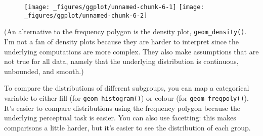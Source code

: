 \begin{Shaded}
\begin{Highlighting}[]
\StringTok{ }
\StringTok{  }\NormalTok{(} \NormalTok{)}
\StringTok{ }
\StringTok{  }\NormalTok{(} \NormalTok{)}
\end{Highlighting}
\end{Shaded}

\begin{figure}[H]
  \texttt{[image: \_figures/ggplot/unnamed-chunk-6-1]}%
  \texttt{[image: \_figures/ggplot/unnamed-chunk-6-2]}
\end{figure}

(An alternative to the frequency polygon is the density plot,
\texttt{geom\_density()}. I'm not a fan of density plots because they
are harder to interpret since the underlying computations are more
complex. They also make assumptions that are not true for all data,
namely that the underlying distribution is continuous, unbounded, and
smooth.)

To compare the distributions of different subgroups, you can map a
categorical variable to either fill (for \texttt{geom\_histogram()}) or
colour (for \texttt{geom\_freqpoly()}). It's easier to compare
distributions using the frequency polygon because the underlying
perceptual task is easier. You can also use facetting: this makes
comparisons a little harder, but it's easier to see the distribution of
each group.

\begin{Shaded}
\begin{Highlighting}[]
 \StringTok{ }
\StringTok{  }\NormalTok{(} \NormalTok{)}
 \StringTok{ }
\StringTok{  }\NormalTok{(} \NormalTok{) +}\StringTok{ }
\StringTok{  } \NormalTok{)}
\end{Highlighting}
\end{Shaded}

